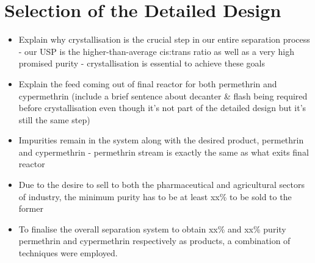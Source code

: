 \section{Selection of the Detailed Design}
\label{sec:design_selection}


\begin{itemize}
    \item Explain why crystallisation is the crucial step in our entire separation process - our USP is the higher-than-average cis:trans ratio as well as a very high promised purity - crystallisation is essential to achieve these goals 
    \item Explain the feed coming out of final reactor for both permethrin and cypermethrin (include a brief sentence about decanter & flash being required before crystallisation even though it's not part of the detailed design but it's still the same step)
    \item Impurities remain in the system along with the desired product, permethrin and cypermethrin - permethrin stream is exactly the same as what exits final reactor
    \item Due to the desire to sell to both the pharmaceutical and agricultural sectors of industry, the minimum purity has to be at least xx\% to be sold to the former
    \item To finalise the overall separation system to obtain xx\% and xx\% purity permethrin and cypermethrin respectively as products, a combination of techniques were employed.
\end{itemize}

